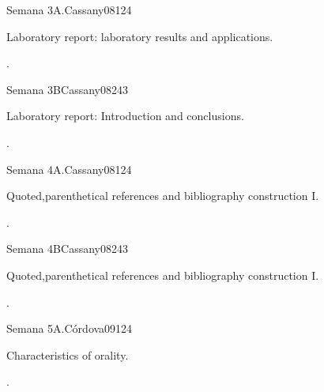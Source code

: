 \begin{syllabus}
\begin{unit}{Semana 3A.}{}{Cassany08}{12}{4}
   \begin{topics}
      \item Laboratory report: laboratory results and applications. 
   \end{topics}
   \begin{learningoutcomes}
      \item .
   \end{learningoutcomes}
\end{unit}

\begin{unit}{Semana 3B}{}{Cassany08}{24}{3}
   \begin{topics}
      \item Laboratory report: Introduction and conclusions. 
   \end{topics}

   \begin{learningoutcomes}
      \item .
      \end{learningoutcomes}
\end{unit}

\begin{unit}{Semana 4A.}{}{Cassany08}{12}{4}
   \begin{topics}
      \item Quoted,parenthetical references and bibliography construction I. 
   \end{topics}
   \begin{learningoutcomes}
      \item .
   \end{learningoutcomes}
\end{unit}

\begin{unit}{Semana 4B}{}{Cassany08}{24}{3}
   \begin{topics}
      \item Quoted,parenthetical references and bibliography construction I.
   \end{topics}

   \begin{learningoutcomes}
      \item .
      \end{learningoutcomes}
\end{unit}


\begin{unit}{Semana 5A.}{}{Córdova09}{12}{4}
   \begin{topics}
      \item Characteristics of orality.
   \end{topics}
   \begin{learningoutcomes}
      \item .
   \end{learningoutcomes}
\end{unit}


\end{syllabus}
